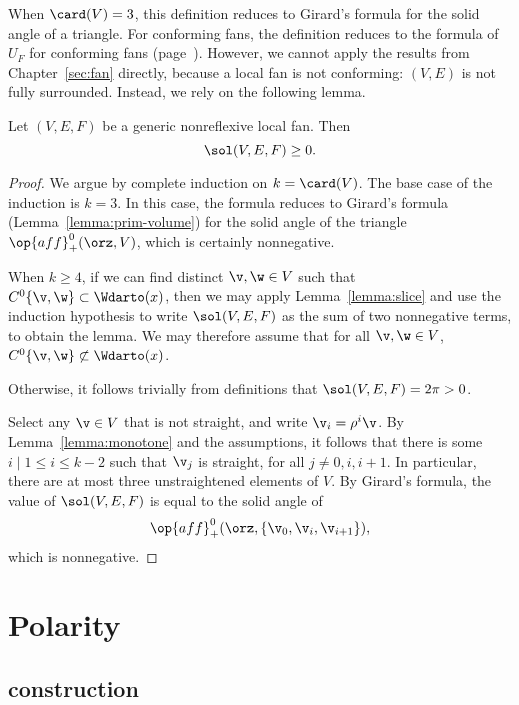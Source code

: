 When $\card(V)=3$, this definition reduces to Girard's formula for the
solid angle of a triangle.  For conforming fans, the definition
reduces to the  formula of $U_F$ for conforming fans
(page~\pageref{def:conforming}).  However, we cannot apply the results
from Chapter~\ref{sec:fan} directly, because a local fan is not
conforming: $(V,E)$ is not fully surrounded. Instead, we rely on the
following lemma.


\begin{lemma}\label{lemma:sol-local}
Let $(V,E,F)$ be a generic nonreflexive local fan.  Then
\[
\sol(V,E,F) \ge 0.  %
\]
\end{lemma}

\begin{proof} 
  We argue by complete induction on $k=\card(V)$.  The base case of
  the induction is $k=3$.  In this case, the formula reduces to
  Girard's formula (Lemma~\ref{lemma:prim-volume}) for the solid angle
  of the triangle $\op{aff}_+^0(\orz,V)$, which is certainly
  nonnegative.

  When $k\ge4$, if we can find distinct $\v,\w\in V$ such that
  $C^0\{\v,\w\}\subset \Wdarto(x)$, then we may apply
  Lemma~\ref{lemma:slice} and use the induction hypothesis to write
  $\sol(V,E,F)$ as the sum of two nonnegative terms, to obtain the
  lemma.  We may therefore assume that for all $\v,\w\in V$,
  $C^0\{\v,\w\}\not\subset \Wdarto(x)$.

  Otherwise,
it follows trivially from definitions that $\sol(V,E,F)=2\pi>0$.

Select any $\v\in V$ that is not straight, and write $\v_i = \rho^i\v$.  By
Lemma~\ref{lemma:monotone} and the assumptions, it follows that there
is some $i\mid 1 \le i \le k-2$ such that $\v_j$ is straight, for all
$j\ne 0,i,i+1$.  In particular, there are at most three unstraightened 
elements of $V$.  By Girard's formula, the value of $\sol(V,E,F)$ is
equal to the solid angle of
\[
\op{aff}_+^0(\orz,\{\v_0,\v_i,\v_{i+1}\}),
\]
which is nonnegative.
\end{proof}



\section{Polarity}


\subsection{construction}

